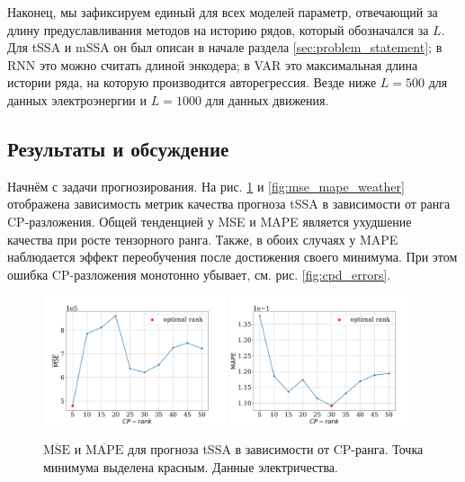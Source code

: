 			Наконец, мы зафиксируем единый для всех моделей параметр, отвечающий за длину предуславливания методов на историю рядов, который обозначался за $ L $. Для tSSA и mSSA он был описан в начале раздела \ref{sec:problem_statement}; в RNN это можно считать длиной энкодера; в VAR это максимальная длина истории ряда, на которую производится авторегрессия. Везде ниже $ L = 500 $ для данных электроэнергии и $ L = 1000 $ для данных движения.		
				
		\subsection{Результаты и обсуждение}
			
			Начнём с задачи прогнозирования. На рис. \ref{fig:mse_mape_electr} и \ref{fig:mse_mape_weather} отображена зависимость метрик качества прогноза tSSA в зависимости от ранга CP-разложения. Общей тенденцией у MSE и MAPE является ухудшение качества при росте тензорного ранга. Также, в обоих случаях у MAPE наблюдается эффект переобучения после достижения своего минимума. При этом ошибка CP-разложения монотонно убывает, см. рис. \ref{fig:cpd_errors}.
			
			\begin{figure}[h]
				\centering
				\includegraphics[width=0.48\textwidth, keepaspectratio]{../experiments/electricity/tssa/figs/prediction/MSE_rank.png}
				\includegraphics[width=0.48\textwidth, keepaspectratio]{../experiments/electricity/tssa/figs/prediction/MAPE_rank.png}
				\caption{$ \overline{\text{MSE}} $ и $ \overline{\text{MAPE}} $ для прогноза tSSA в зависимости от CP-ранга. Точка минимума выделена красным. Данные электричества.}\label{fig:mse_mape_electr}
			\end{figure}
			
